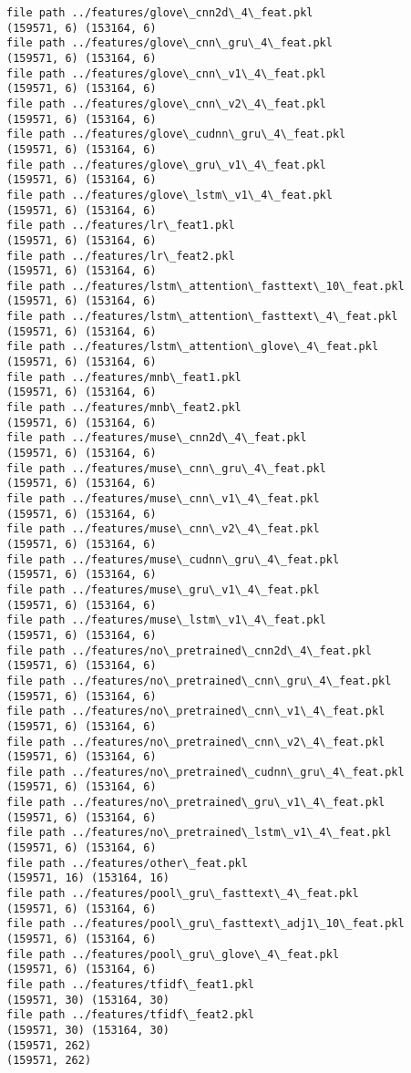 \documentclass[11pt]{article}
\begin{document}
    \begin{Verbatim}[commandchars=\\\{\}]
file path ../features/glove\_cnn2d\_4\_feat.pkl
(159571, 6) (153164, 6)
file path ../features/glove\_cnn\_gru\_4\_feat.pkl
(159571, 6) (153164, 6)
file path ../features/glove\_cnn\_v1\_4\_feat.pkl
(159571, 6) (153164, 6)
file path ../features/glove\_cnn\_v2\_4\_feat.pkl
(159571, 6) (153164, 6)
file path ../features/glove\_cudnn\_gru\_4\_feat.pkl
(159571, 6) (153164, 6)
file path ../features/glove\_gru\_v1\_4\_feat.pkl
(159571, 6) (153164, 6)
file path ../features/glove\_lstm\_v1\_4\_feat.pkl
(159571, 6) (153164, 6)
file path ../features/lr\_feat1.pkl
(159571, 6) (153164, 6)
file path ../features/lr\_feat2.pkl
(159571, 6) (153164, 6)
file path ../features/lstm\_attention\_fasttext\_10\_feat.pkl
(159571, 6) (153164, 6)
file path ../features/lstm\_attention\_fasttext\_4\_feat.pkl
(159571, 6) (153164, 6)
file path ../features/lstm\_attention\_glove\_4\_feat.pkl
(159571, 6) (153164, 6)
file path ../features/mnb\_feat1.pkl
(159571, 6) (153164, 6)
file path ../features/mnb\_feat2.pkl
(159571, 6) (153164, 6)
file path ../features/muse\_cnn2d\_4\_feat.pkl
(159571, 6) (153164, 6)
file path ../features/muse\_cnn\_gru\_4\_feat.pkl
(159571, 6) (153164, 6)
file path ../features/muse\_cnn\_v1\_4\_feat.pkl
(159571, 6) (153164, 6)
file path ../features/muse\_cnn\_v2\_4\_feat.pkl
(159571, 6) (153164, 6)
file path ../features/muse\_cudnn\_gru\_4\_feat.pkl
(159571, 6) (153164, 6)
file path ../features/muse\_gru\_v1\_4\_feat.pkl
(159571, 6) (153164, 6)
file path ../features/muse\_lstm\_v1\_4\_feat.pkl
(159571, 6) (153164, 6)
file path ../features/no\_pretrained\_cnn2d\_4\_feat.pkl
(159571, 6) (153164, 6)
file path ../features/no\_pretrained\_cnn\_gru\_4\_feat.pkl
(159571, 6) (153164, 6)
file path ../features/no\_pretrained\_cnn\_v1\_4\_feat.pkl
(159571, 6) (153164, 6)
file path ../features/no\_pretrained\_cnn\_v2\_4\_feat.pkl
(159571, 6) (153164, 6)
file path ../features/no\_pretrained\_cudnn\_gru\_4\_feat.pkl
(159571, 6) (153164, 6)
file path ../features/no\_pretrained\_gru\_v1\_4\_feat.pkl
(159571, 6) (153164, 6)
file path ../features/no\_pretrained\_lstm\_v1\_4\_feat.pkl
(159571, 6) (153164, 6)
file path ../features/other\_feat.pkl
(159571, 16) (153164, 16)
file path ../features/pool\_gru\_fasttext\_4\_feat.pkl
(159571, 6) (153164, 6)
file path ../features/pool\_gru\_fasttext\_adj1\_10\_feat.pkl
(159571, 6) (153164, 6)
file path ../features/pool\_gru\_glove\_4\_feat.pkl
(159571, 6) (153164, 6)
file path ../features/tfidf\_feat1.pkl
(159571, 30) (153164, 30)
file path ../features/tfidf\_feat2.pkl
(159571, 30) (153164, 30)
(159571, 262)
(159571, 262)

    \end{Verbatim}
\end{document}
